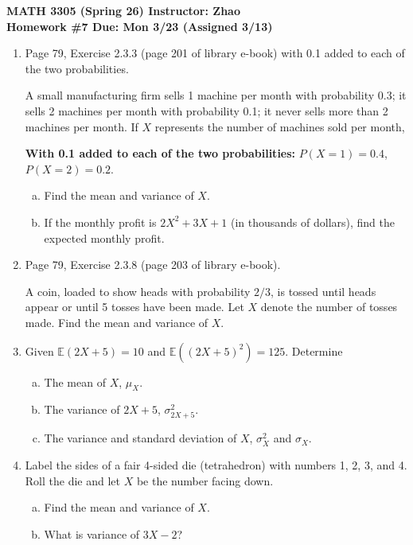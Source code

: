 \documentclass[12pt]{article}
\begin{document}
\begin{center}
  \textbf{\large MATH 3305 (Spring 26) \hfill Instructor: Zhao}\\[4pt]
  \textbf{\large Homework \#7 \hfill Due: Mon 3/23 (Assigned 3/13)}
\end{center}

\bigskip

\begin{enumerate}
  \item Page 79, Exercise 2.3.3 (page 201 of library e-book) with 0.1 added to each of the two probabilities.

    A small manufacturing firm sells 1 machine per month with probability 0.3; it sells 2 machines per month with probability 0.1; it never sells more than 2 machines per month. If $X$ represents the number of machines sold per month,

    \textbf{With 0.1 added to each of the two probabilities:} $P(X=1) = 0.4$, $P(X=2) = 0.2$.
    \begin{enumerate}[(a)]
      \item Find the mean and variance of $X$.
      \item If the monthly profit is $2X^2 + 3X + 1$ (in thousands of dollars), find the expected monthly profit.
    \end{enumerate}

  \item Page 79, Exercise 2.3.8 (page 203 of library e-book).

    A coin, loaded to show heads with probability $2/3$, is tossed until heads appear or until 5 tosses have been made. Let $X$ denote the number of tosses made. Find the mean and variance of $X$.

  \item Given $\mathbb{E}(2X + 5) = 10$ and $\mathbb{E}\!\left((2X + 5)^2\right) = 125$. Determine
    \begin{enumerate}[(a)]
      \item The mean of $X$, $\mu_X$.
      \item The variance of $2X + 5$, $\sigma_{2X+5}^2$.
      \item The variance and standard deviation of $X$, $\sigma_X^2$ and $\sigma_X$.
    \end{enumerate}

  \item Label the sides of a fair 4-sided die (tetrahedron) with numbers 1, 2, 3, and 4. Roll the die and let $X$ be the number facing down.
    \begin{enumerate}[(a)]
      \item Find the mean and variance of $X$.
      \item What is variance of $3X - 2$?
    \end{enumerate}


\end{enumerate}
\end{document}
